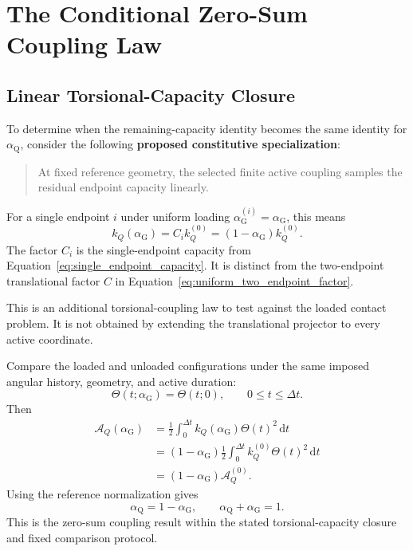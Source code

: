 \section{The Conditional Zero-Sum Coupling Law}

\subsection{Linear Torsional-Capacity Closure}

To determine when the remaining-capacity identity becomes the same identity for $\alpha_{\mathrm Q}$, consider the following \textbf{proposed constitutive specialization}:

\begin{quote}
At fixed reference geometry, the selected finite active coupling samples the residual endpoint capacity linearly.
\end{quote}

For a single endpoint $i$ under uniform loading $\alpha_{\mathrm G}^{(i)}=\alpha_{\mathrm G}$, this means
\begin{equation}
    \boxed{
    k_Q(\alpha_{\mathrm G})
    =C_i k_Q^{(0)}
    =(1-\alpha_{\mathrm G})k_Q^{(0)}
    }.
\end{equation}
The factor $C_i$ is the single-endpoint capacity from Equation~\eqref{eq:single_endpoint_capacity}. It is distinct from the two-endpoint translational factor $C$ in Equation~\eqref{eq:uniform_two_endpoint_factor}.

This is an additional torsional-coupling law to test against the loaded contact problem. It is not obtained by extending the translational projector to every active coordinate.

Compare the loaded and unloaded configurations under the same imposed angular history, geometry, and active duration:
\begin{equation}
    \Theta(t;\alpha_{\mathrm G})=\Theta(t;0),
    \qquad 0\leq t\leq\Delta t.
\end{equation}
Then
\begin{equation}
    \begin{aligned}
    \mathcal A_Q(\alpha_{\mathrm G})
    &=\frac12\int_0^{\Delta t}
      k_Q(\alpha_{\mathrm G})\Theta(t)^2\,\mathrm dt\\
    &=(1-\alpha_{\mathrm G})
      \frac12\int_0^{\Delta t}
      k_Q^{(0)}\Theta(t)^2\,\mathrm dt\\
    &=(1-\alpha_{\mathrm G})\mathcal A_Q^{(0)}.
    \end{aligned}
\end{equation}
Using the reference normalization gives
\begin{equation}
    \boxed{
    \alpha_{\mathrm Q}=1-\alpha_{\mathrm G},
    \qquad
    \alpha_{\mathrm Q}+\alpha_{\mathrm G}=1
    }.
\end{equation}
This is the zero-sum coupling result within the stated torsional-capacity closure and fixed comparison protocol.

